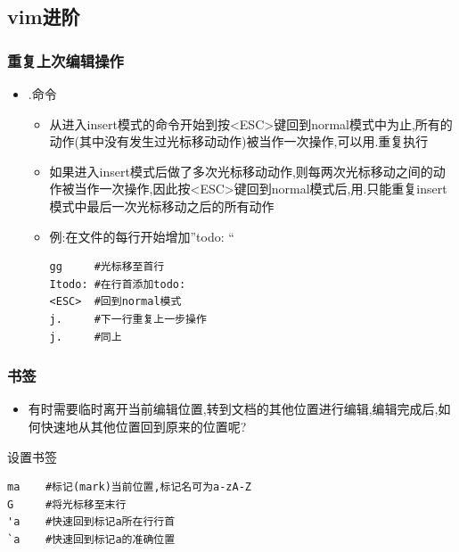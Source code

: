 \documentclass[xcolor=svgnames,presentation]{beamer}
\begin{document}
\subsection{vim进阶}
\label{sec-4-6}
\begin{frame}[fragile]
\frametitle{重复上次编辑操作}
\label{sec-4-6-1}
\begin{itemize}

\item .命令
\label{sec-4-6-1-1}%
\begin{itemize}

\item 从进入insert模式的命令开始到按<ESC>键回到normal模式中为止,所有的动作(其中没有发生过光标移动动作)被当作一次操作,可以用.重复执行
\label{sec-4-6-1-1-1}%

\item 如果进入insert模式后做了多次光标移动动作,则每两次光标移动之间的动作被当作一次操作,因此按<ESC>键回到normal模式后,用.只能重复insert模式中最后一次光标移动之后的所有动作
\label{sec-4-6-1-1-2}%

\item 例:在文件的每行开始增加”todo: “\\
\label{sec-4-6-1-1-3}%
\begin{verbatim}
gg     #光标移至首行
Itodo: #在行首添加todo:
<ESC>  #回到normal模式
j.     #下一行重复上一步操作
j.     #同上
\end{verbatim}
\end{itemize} %
\end{itemize} %
\end{frame}
\begin{frame}[fragile]
\frametitle{书签}
\label{sec-4-6-2}
\begin{itemize}

\item 有时需要临时离开当前编辑位置,转到文档的其他位置进行编辑,编辑完成后,如何快速地从其他位置回到原来的位置呢?
\label{sec-4-6-2-1}%
\end{itemize} %
\begin{exampleblock}{设置书签}
\label{sec-4-6-2-2}


\begin{verbatim}
ma    #标记(mark)当前位置,标记名可为a-zA-Z
G     #将光标移至末行
'a    #快速回到标记a所在行行首
`a    #快速回到标记a的准确位置
\end{verbatim}
\end{exampleblock}
\end{frame}
\end{document}
